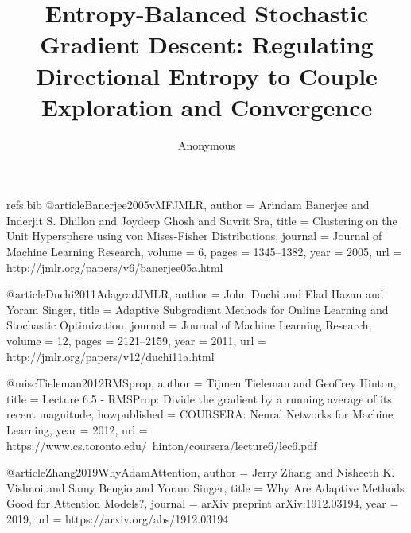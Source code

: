 \begin{filecontents*}{refs.bib}
@article{Banerjee2005vMFJMLR,
  author = {Arindam Banerjee and Inderjit S. Dhillon and Joydeep Ghosh and Suvrit Sra},
  title = {Clustering on the Unit Hypersphere using von Mises-Fisher Distributions},
  journal = {Journal of Machine Learning Research},
  volume = {6},
  pages = {1345--1382},
  year = {2005},
  url = {http://jmlr.org/papers/v6/banerjee05a.html}
}

@article{Duchi2011AdagradJMLR,
  author = {John Duchi and Elad Hazan and Yoram Singer},
  title = {Adaptive Subgradient Methods for Online Learning and Stochastic Optimization},
  journal = {Journal of Machine Learning Research},
  volume = {12},
  pages = {2121--2159},
  year = {2011},
  url = {http://jmlr.org/papers/v12/duchi11a.html}
}

@misc{Tieleman2012RMSprop,
  author = {Tijmen Tieleman and Geoffrey Hinton},
  title = {Lecture 6.5 - RMSProp: Divide the gradient by a running average of its recent magnitude},
  howpublished = {COURSERA: Neural Networks for Machine Learning},
  year = {2012},
  url = {https://www.cs.toronto.edu/~hinton/coursera/lecture6/lec6.pdf}
}

@article{Zhang2019WhyAdamAttention,
  author = {Jerry Zhang and Nisheeth K. Vishnoi and Samy Bengio and Yoram Singer},
  title = {Why Are Adaptive Methods Good for Attention Models?},
  journal = {arXiv preprint arXiv:1912.03194},
  year = {2019},
  url = {https://arxiv.org/abs/1912.03194}
}
\end{filecontents*}

\documentclass[11pt]{article}
\usepackage[margin=1in]{geometry}
\usepackage{graphicx}
\usepackage{amsmath,amssymb,amsthm}
\usepackage{booktabs}
\usepackage{adjustbox}
\usepackage{tikz}
\usepackage{pgfplots}
\usepackage{pgfplotstable}
\usepackage[ruled,vlined]{algorithm2e}
\usepackage{siunitx}
\usepackage{hyperref}
\usepackage{float}
\hypersetup{colorlinks=true,linkcolor=blue,citecolor=blue,urlcolor=blue}
\pgfplotsset{compat=1.18}

\newtheorem{theorem}{Theorem}
\newtheorem{remark}{Remark}
\newtheorem{lemma}{Lemma}

\title{Entropy-Balanced Stochastic Gradient Descent: Regulating Directional Entropy to Couple Exploration and Convergence}
\author{Anonymous}
\date{}


\maketitle

